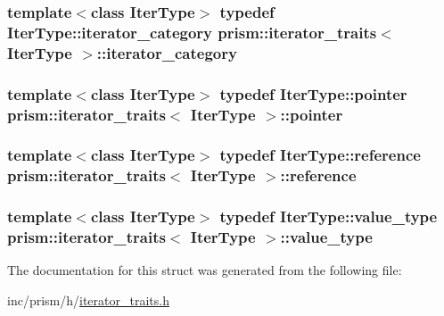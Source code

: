 \subsubsection[{\texorpdfstring{iterator\+\_\+category}{iterator_category}}]{\setlength{\rightskip}{0pt plus 5cm}template$<$class Iter\+Type$>$ typedef Iter\+Type\+::iterator\+\_\+category {\bf prism\+::iterator\+\_\+traits}$<$ Iter\+Type $>$\+::{\bf iterator\+\_\+category}}\hypertarget{structprism_1_1iterator__traits_a2e20906a677a5a465bf343ff4281a010}{}\label{structprism_1_1iterator__traits_a2e20906a677a5a465bf343ff4281a010}
\subsubsection[{\texorpdfstring{pointer}{pointer}}]{\setlength{\rightskip}{0pt plus 5cm}template$<$class Iter\+Type$>$ typedef Iter\+Type\+::pointer {\bf prism\+::iterator\+\_\+traits}$<$ Iter\+Type $>$\+::{\bf pointer}}\hypertarget{structprism_1_1iterator__traits_a5ec4c84886d15b5efa1bb3fd0984dd71}{}\label{structprism_1_1iterator__traits_a5ec4c84886d15b5efa1bb3fd0984dd71}
\subsubsection[{\texorpdfstring{reference}{reference}}]{\setlength{\rightskip}{0pt plus 5cm}template$<$class Iter\+Type$>$ typedef Iter\+Type\+::reference {\bf prism\+::iterator\+\_\+traits}$<$ Iter\+Type $>$\+::{\bf reference}}\hypertarget{structprism_1_1iterator__traits_af4ddc7a938960bb8c558e6eae9ee1548}{}\label{structprism_1_1iterator__traits_af4ddc7a938960bb8c558e6eae9ee1548}
\subsubsection[{\texorpdfstring{value\+\_\+type}{value_type}}]{\setlength{\rightskip}{0pt plus 5cm}template$<$class Iter\+Type$>$ typedef Iter\+Type\+::value\+\_\+type {\bf prism\+::iterator\+\_\+traits}$<$ Iter\+Type $>$\+::{\bf value\+\_\+type}}\hypertarget{structprism_1_1iterator__traits_a764c6740051f048bb81ba63d993e96cd}{}\label{structprism_1_1iterator__traits_a764c6740051f048bb81ba63d993e96cd}


The documentation for this struct was generated from the following file\+:\begin{DoxyCompactItemize}
\item 
inc/prism/h/\hyperlink{iterator__traits_8h}{iterator\+\_\+traits.\+h}\end{DoxyCompactItemize}
